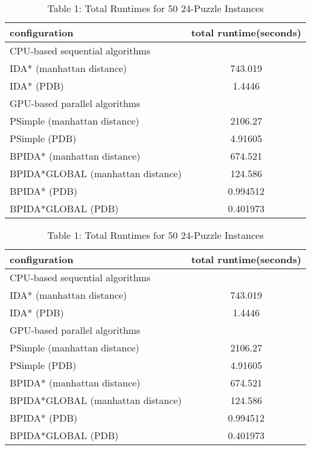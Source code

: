 \documentclass[a4paper,11pt,oneside,openany]{jsbook}
\begin{document}
\begin{table}[]
\centering
\caption{Table 1: Total Runtimes for 50 24-Puzzle Instances}
\label{my-label}
\begin{tabular}{|l|c|}
\hline
configuration & \multicolumn{1}{l|}{total runtime(seconds)} \\ \hline
\multicolumn{2}{|l|}{CPU-based sequential algorithms} \\ \hline
IDA* (manhattan distance) & 743.019 \\
IDA* (PDB) & 1.4446 \\ \hline
\multicolumn{2}{|l|}{GPU-based parallel algorithms} \\ \hline
PSimple (manhattan distance) & 2106.27 \\
PSimple (PDB) & 4.91605 \\
BPIDA* (manhattan distance) & 674.521 \\
BPIDA*GLOBAL (manhattan distance) & 124.586 \\
BPIDA* (PDB) & 0.994512 \\
BPIDA*GLOBAL (PDB) & 0.401973 \\ \hline
\end{tabular}
\end{table}

\begin{table}[]
\centering
\caption{Table 1: Total Runtimes for 50 24-Puzzle Instances}
\label{my-label}
\begin{tabular}{|l|c|}
\hline
configuration & \multicolumn{1}{l|}{total runtime(seconds)} \\ \hline
\multicolumn{2}{|l|}{CPU-based sequential algorithms} \\ \hline
IDA* (manhattan distance) & 743.019 \\
IDA* (PDB) & 1.4446 \\ \hline
\multicolumn{2}{|l|}{GPU-based parallel algorithms} \\ \hline
PSimple (manhattan distance) & 2106.27 \\
PSimple (PDB) & 4.91605 \\
BPIDA* (manhattan distance) & 674.521 \\
BPIDA*GLOBAL (manhattan distance) & 124.586 \\
BPIDA* (PDB) & 0.994512 \\
BPIDA*GLOBAL (PDB) & 0.401973 \\ \hline
\end{tabular}
\end{table}
\end{document}
